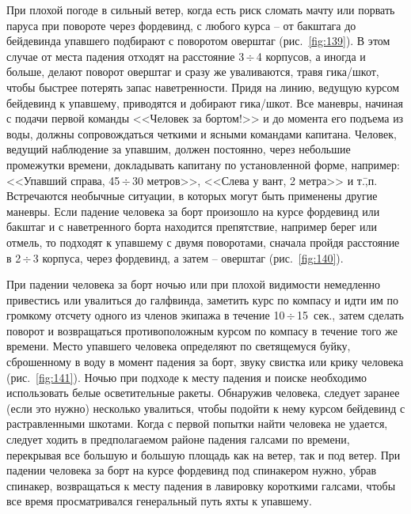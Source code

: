 \documentclass[a4paper, 12pt, twoside, final, book, russian, fittopage, cyremdash]{ncc}
\newcommand{\otdo}{\,\ensuremath{\div}\,}
\newcommand{\ris}[1]{\ref{fig:#1}}
\begin{document}
При плохой погоде в сильный ветер, когда есть риск сломать мачту или порвать паруса при повороте через фордевинд, с любого курса \--- от бакштага до бейдевинда упавшего подбирают с поворотом оверштаг (рис.~\ris{139}). В этом случае от места падения отходят на расстояние 3\otdo 4 корпусов, а иногда и больше, делают поворот оверштаг и сразу же уваливаются, травя гика\-/шкот, чтобы быстрее потерять запас наветренности. Придя на линию, ведущую курсом бейдевинд к упавшему, приводятся и добирают гика\-/шкот. Все маневры, начиная с подачи первой команды <<Человек за бортом!>> и до момента его подъема из воды, должны сопровождаться четкими и ясными командами капитана. Человек, ведущий наблюдение за упавшим, должен постоянно, через небольшие промежутки времени, докладывать капитану по установленной форме, например: <<Упавший справа, 45\otdo 30 метров>>, <<Слева у вант, 2 метра>> и т.\=,п. Встречаются необычные ситуации, в которых могут быть применены другие маневры. Если падение человека за борт произошло на курсе фордевинд или бакштаг и с наветренного борта находится препятствие, например берег или отмель, то подходят к упавшему с двумя поворотами, сначала пройдя расстояние в 2\otdo 3 корпуса, через фордевинд, а затем \--- оверштаг (рис.~\ris{140}).

При падении человека за борт ночью или при плохой видимости немедленно привестись или увалиться до галфвинда, заметить курс по компасу и идти им по громкому отсчету одного из членов экипажа в течение 10\otdo 15~сек., затем сделать поворот и возвращаться противоположным курсом по компасу в течение того же времени. Место упавшего человека определяют по светящемуся буйку, сброшенному в воду в момент падения за борт, звуку свистка или крику человека (рис.~\ris{141}). Ночью при подходе к месту падения и поиске необходимо использовать белые осветительные ракеты. Обнаружив человека, следует заранее (если это нужно) несколько увалиться, чтобы подойти к нему курсом бейдевинд с растравленными шкотами. Когда с первой попытки найти человека не удается, следует ходить в предполагаемом районе падения галсами по времени, перекрывая все большую и большую площадь как на ветер, так и под ветер. При падении человека за борт на курсе фордевинд под спинакером нужно, убрав спинакер, возвращаться к месту падения в лавировку короткими галсами, чтобы все время просматривался генеральный путь яхты к упавшему.
\end{document}
